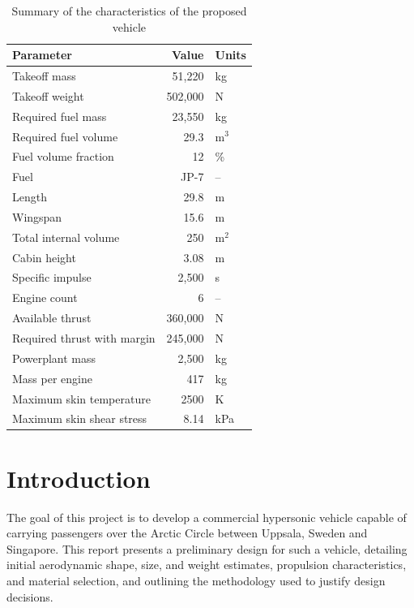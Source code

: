 \documentclass[10pt,a4paper]{article}
\begin{document}
\begin{table}[H]
\centering
\caption{Summary of the characteristics of the proposed vehicle}
\begin{tabular}{l r l}
\hline
\textbf{Parameter} & \textbf{Value} & \textbf{Units} \\
\hline

Takeoff mass & 51,220 & kg \\
Takeoff weight & 502,000 & N \\

Required fuel mass & 23,550 & kg \\
Required fuel volume & 29.3 & m$^3$ \\
Fuel volume fraction & 12 & \% \\
Fuel & JP-7 & -- \\

Length & 29.8 & m \\
Wingspan & 15.6 & m \\
Total internal volume & 250 & m$^2$ \\
Cabin height & 3.08 & m \\

Specific impulse & 2,500 & s \\
Engine count & 6 & -- \\
Available thrust & 360,000 & N \\
Required thrust with margin & 245,000 & N \\
Powerplant mass & 2,500 & kg \\
Mass per engine & 417 & kg \\

Maximum skin temperature & 2500 & K \\
Maximum skin shear stress & 8.14 & kPa \\



\hline
\end{tabular}
\label{tab:breguet_optimizer_best_case}
\end{table}
\tableofcontents%
\setlength{\parskip}{1ex}%

\section{Introduction}
\label{sec:intro}
The goal of this project is to develop a commercial hypersonic vehicle capable of carrying passengers over the Arctic Circle between Uppsala, Sweden and Singapore. This report presents a preliminary design for such a vehicle, detailing initial aerodynamic shape, size, and weight estimates, propulsion characteristics, and material selection, and outlining the methodology used to justify design decisions.
\end{document}
